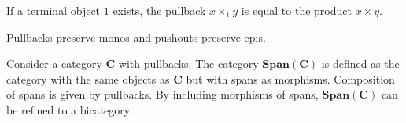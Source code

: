     \begin{property}[Product]
        If a terminal object $1$ exists, the pullback $x\times_1y$ is equal to the product $x\times y$.
    \end{property}


    \begin{property}
        Pullbacks preserve monos and pushouts preserve epis.
    \end{property}

    \begin{property}\label{cat:span_category}
        Consider a category $\mathbf{C}$ with pullbacks. The category $\mathbf{Span}(\mathbf{C})$ is defined as the category with the same objects as $\mathbf{C}$ but with spans as morphisms. Composition of spans is given by pullbacks. By including morphisms of spans, $\mathbf{Span}(\mathbf{C})$ can be refined to a bicategory.
    \end{property}

